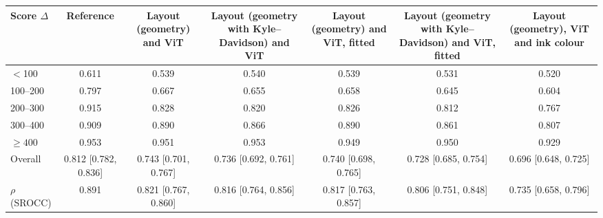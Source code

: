 \begin{table}[htbp]
  \label{tab:ensembles_by_elo_gap}
  \begin{tabular}{lcccccc}
    \toprule
    Score $\Delta$ & Reference & Layout (geometry) and ViT & Layout (geometry with Kyle--Davidson) and ViT & Layout (geometry) and ViT, fitted & Layout (geometry with Kyle--Davidson) and ViT, fitted & Layout (geometry), ViT and ink colour \\
    \midrule
    $<$100 & 0.611 & 0.539 & 0.540 & 0.539 & 0.531 & 0.520 \\
    100--200 & 0.797 & 0.667 & 0.655 & 0.658 & 0.645 & 0.604 \\
    200--300 & 0.915 & 0.828 & 0.820 & 0.826 & 0.812 & 0.767 \\
    300--400 & 0.909 & 0.890 & 0.866 & 0.890 & 0.861 & 0.807 \\
    $\geq 400$ & 0.953 & 0.951 & 0.953 & 0.949 & 0.950 & 0.929 \\
    \midrule
    Overall & 0.812 [0.782, 0.836] & 0.743 [0.701, 0.767] & 0.736 [0.692, 0.761] & 0.740 [0.698, 0.765] & 0.728 [0.685, 0.754] & 0.696 [0.648, 0.725] \\
    \midrule
    $\rho$ (SROCC) & 0.891 & 0.821 [0.767, 0.860] & 0.816 [0.764, 0.856] & 0.817 [0.763, 0.857] & 0.806 [0.751, 0.848] & 0.735 [0.658, 0.796] \\
    \bottomrule
  \end{tabular}
\end{table}

